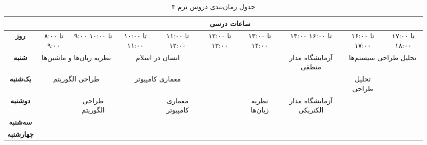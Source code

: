 \documentclass{article}
\begin{document}
	
 	\begin{sidewaystable}[h]
		\begin{center}	
 			\caption{جدول زمان‌بندی دروس ترم ۴}	
			\begin{tabular}{|c|c|c|c|c|c|c|c|c|c|c|}
				\cline{2-11}
				\multicolumn{1}{c}{}
				& \multicolumn{10}{|c|}{\textbf{ساعات درسی}} \\ \hline
				
				
			   \textbf{روز} 
			     & ۸:۰۰ تا ۹:۰۰ & ۹:۰۰ تا ۱۰:۰۰ &
     			۱۰:۰۰ تا ۱۱:۰۰ & ۱۱:۰۰ تا ۱۲:۰۰ &
     			۱۲:۰۰ تا ۱۳:۰۰ & ۱۳:۰۰ تا ۱۴:۰۰ &
				\multicolumn{2}{|c|}{۱۴:۰۰ تا ۱۶:۰۰} &
				۱۶:۰۰ تا ۱۷:۰۰ & ۱۷:۰۰ تا ۱۸:۰۰ \\
				\hline
				\hline
				
				\textbf{شنبه} &
				\multicolumn{2}{|c|}{نظریه زبان‌ها و ماشین‌ها} &
				\multicolumn{2}{|c|}{انسان در اسلام} &
				\multicolumn{2}{|c|}{} &
				\multicolumn{2}{|c|}{آزمایشگاه مدار منطقی} &
				\multicolumn{2}{|c|}{تحلیل طراحی سیستم‌ها} \\
				\hline
				
				\textbf{یک‌شنبه} &
				\multicolumn{2}{|c|}{طراحی الگوریتم} &
				\multicolumn{2}{|c|}{معماری کامپیوتر} &
				\multicolumn{2}{|c|}{} &
				\multicolumn{2}{|c|}{} &
				تحلیل طراحی & \\
				\hline
				
				\textbf{دوشنبه} &
				& طراحی الگوریتم &
				& معماری کامپیوتر &
			    & نظریه‌ زبان‌ها &
			    \multicolumn{2}{|c|}{آزمایشگاه مدار الکتریکی} &
				\multicolumn{2}{|c|}{} \\
				\hline
				
				\textbf{سه‌شنبه} &
				\multicolumn{2}{|c|}{} &
                \multicolumn{2}{|c|}{} &
				\multicolumn{2}{|c|}{} &
				\multicolumn{2}{|c|}{} &
				\multicolumn{2}{|c|}{} \\
				\hline
				
				\textbf{چهارشنبه} &
				\multicolumn{2}{|c|}{} &
				\multicolumn{2}{|c|}{} &
				\multicolumn{2}{|c|}{} &
				\multicolumn{2}{|c|}{} &
				\multicolumn{2}{|c|}{} \\
				\hline
            \end{tabular}
		\end{center}
 	\end{sidewaystable}
\end{document}
